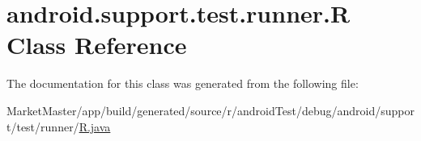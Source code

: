 \hypertarget{classandroid_1_1support_1_1test_1_1runner_1_1R}{}\section{android.\+support.\+test.\+runner.\+R Class Reference}
\label{classandroid_1_1support_1_1test_1_1runner_1_1R}


The documentation for this class was generated from the following file\+:\begin{DoxyCompactItemize}
\item 
Market\+Master/app/build/generated/source/r/android\+Test/debug/android/support/test/runner/\mbox{\hyperlink{androidTest_2debug_2android_2support_2test_2runner_2R_8java}{R.\+java}}\end{DoxyCompactItemize}
